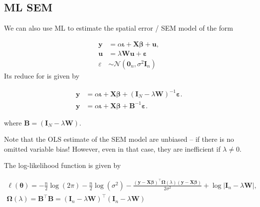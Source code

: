 \documentclass[
  letterpaper,
  DIV=11,
  numbers=noendperiod]{scrreprt}
\begin{document}
\hypertarget{ml-sem}{%
\subsection{ML SEM}\label{ml-sem}}

We can also use ML to estimate the spatial error / SEM model of the form

\[
        \begin{equation} 
        \begin{split}
        {\boldsymbol{\mathbf{y}}}&=\alpha{\boldsymbol{\mathbf{\iota}}}+{\boldsymbol{\mathbf{X}}}{\boldsymbol{\mathbf{\beta}}}+{\boldsymbol{\mathbf{u}}},\\
        {\boldsymbol{\mathbf{u}}}&=\lambda{\boldsymbol{\mathbf{W}}}{\boldsymbol{\mathbf{u}}}+{\boldsymbol{\mathbf{\varepsilon}}}\\
        \varepsilon  &\sim \mathcal{N}(\boldsymbol{\mathbf{0}}_n , \sigma^2\boldsymbol{\mathbf{I}}_n)
        \end{split} 
        \end{equation}
\] Its reduce for is given by

\[
        \begin{equation} 
        \begin{split}
        {\boldsymbol{\mathbf{y}}}&=\alpha{\boldsymbol{\mathbf{\iota}}}+{\boldsymbol{\mathbf{X}}}{\boldsymbol{\mathbf{\beta}}}+({\boldsymbol{\mathbf{I}}_N}-\lambda {\boldsymbol{\mathbf{W}}})^{-1}{\boldsymbol{\mathbf{\varepsilon}}}.\\
        {\boldsymbol{\mathbf{y}}}&=\alpha{\boldsymbol{\mathbf{\iota}}}+{\boldsymbol{\mathbf{X}}}{\boldsymbol{\mathbf{\beta}}}+\boldsymbol{\mathbf{B}}^{-1}{\boldsymbol{\mathbf{\varepsilon}}}.
        \end{split} 
        \end{equation}
\]

where
\(\boldsymbol{\mathbf{B}} = ({\boldsymbol{\mathbf{I}}_N}-\lambda {\boldsymbol{\mathbf{W}}})\).

Note that the OLS estimate of the SEM model are unbiased -- if there is
no omitted variable bias! However, even in that case, they are
inefficient if \(\lambda \neq 0\).

The log-likelihood function is given by

\[
\begin{split}
\ell(\boldsymbol{\mathbf{\theta}}) = - \frac{n}{2}\log(2\pi) - \frac{n}{2}\log(\sigma^2)-\frac{(\boldsymbol{\mathbf{y}} - \boldsymbol{\mathbf{X}}\boldsymbol{\mathbf{\beta}})^\top \boldsymbol{\mathbf{\Omega}}(\lambda) (\boldsymbol{\mathbf{y}} - \boldsymbol{\mathbf{X}}\boldsymbol{\mathbf{\beta}})}{2\sigma^2} + \log\left|\boldsymbol{\mathbf{I}}_n - \lambda \boldsymbol{\mathbf{W}}\right|, \\
\boldsymbol{\mathbf{\Omega}}(\lambda) = \boldsymbol{\mathbf{B}}^\top \boldsymbol{\mathbf{B}} = \left(\boldsymbol{\mathbf{I}}_n-\lambda\boldsymbol{\mathbf{W}}\right)^\top \left(\boldsymbol{\mathbf{I}}_n-\lambda\boldsymbol{\mathbf{W}}\right)
\end{split}
\]
\end{document}
